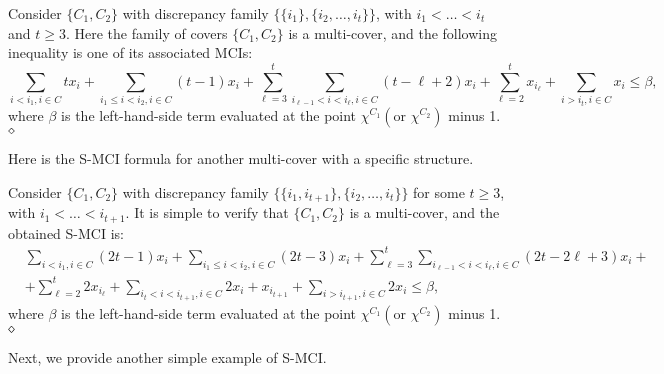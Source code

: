  \begin{example}
 \label{exam: 3}
 Consider $\{C_1, C_2\}$ with discrepancy family $\{\{i_1\}, \{i_2, \ldots, i_t\}\}$, with $i_1 < \ldots < i_{t}$ and $t \geq 3$. Here the family of covers $\{C_1, C_2\}$ is a multi-cover, and the following inequality is one of its associated MCIs:
 {\small
 \begin{equation}
 \label{eq: CAI_1}
 \sum_{i<i_1, i \in C} t x_i +  \sum_{i_1 \leq i < i_2,  i \in C} (t-1) x_i + \sum_{\ell=3}^{t} \sum_{i_{\ell-1} < i < i_\ell,  i \in C} (t-\ell+2) x_i + \sum_{\ell=2}^t x_{i_\ell} + \sum_{i>i_t,  i \in C} x_i \leq \beta,
 \end{equation}
 }
where $\beta$ is the left-hand-side term evaluated at the point $\chi^{C_1} (\text{or } \chi^{C_2})$  minus 1. 
 $\hfill\diamond$
 \end{example}
 
Here is the S-MCI formula for another multi-cover with a specific structure. 
 
\begin{example}
\label{exam: 1_t+1}
Consider $\{C_1, C_2\}$ with discrepancy family $\{\{i_1, i_{t+1}\}, \{i_2, \ldots, i_t\}\}$ for some $t \geq 3$, with $i_1 < \ldots < i_{t+1}$. 
It is simple to verify that $\{C_1, C_2\}$ is a multi-cover, and the obtained S-MCI is:
{\small
\begin{equation}
\label{eq: CAI_2}
\begin{split}
& \sum_{i<i_1, i \in C} (2t - 1) x_i + \sum_{i_1 \leq i < i_2,  i \in C} (2t - 3) x_i + \sum_{\ell=3}^{t} \sum_{i_{\ell-1} < i < i_\ell,  i \in C} (2t-2\ell+3) x_i + \\
&  + \sum_{\ell=2}^t 2 x_{i_\ell} + \sum_{i_t < i< i_{t+1},  i \in C} 2 x_i + x_{i_{t+1}} + \sum_{i > i_{t+1}, i \in C} 2x_i \leq \beta,
\end{split}
\end{equation}
}
where $\beta$ is the left-hand-side term evaluated at the point $\chi^{C_1} (\text{or }\chi^{C_2})$ minus 1. 
$\hfill\diamond$
\end{example}

Next, we provide another simple example of S-MCI. 

